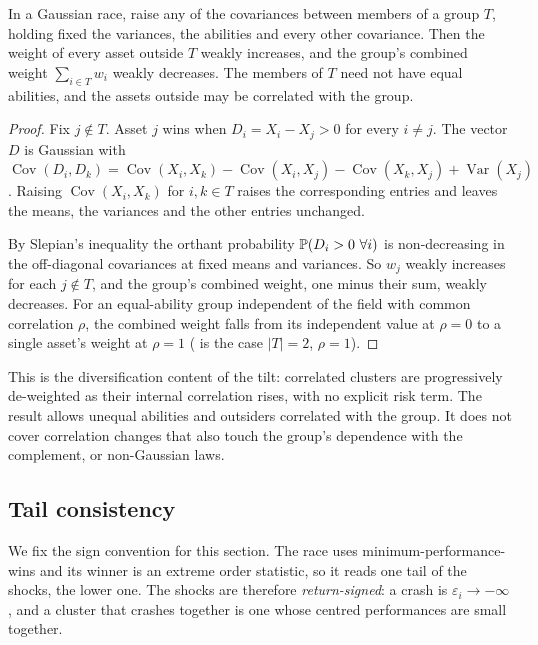 \begin{proposition}
\label{prop:monotone}
In a Gaussian race, raise any of the covariances between members of a group $T$,
holding fixed the variances, the abilities and every other covariance. Then the
weight of every asset outside $T$ weakly increases, and the group's combined weight
$\sum_{i\in T} w_i$ weakly decreases. The members of $T$ need not have equal
abilities, and the assets outside may be correlated with the group.
\end{proposition}
\begin{proof}
Fix $j \notin T$. Asset $j$ wins when $D_i = X_i - X_j > 0$ for every $i \neq j$.
The vector $D$ is Gaussian with
$\operatorname{Cov}(D_i, D_k) = \operatorname{Cov}(X_i, X_k)
- \operatorname{Cov}(X_i, X_j) - \operatorname{Cov}(X_k, X_j)
+ \operatorname{Var}(X_j)$. Raising $\operatorname{Cov}(X_i, X_k)$ for
$i, k \in T$ raises the corresponding entries and leaves the means, the variances
and the other entries unchanged.

By Slepian's inequality \parencite{slepian1962} the orthant probability
$\mathbb{P}(D_i > 0\ \forall i)$ is non-decreasing in the off-diagonal covariances at
fixed means and variances. So $w_j$ weakly increases for each $j \notin T$, and the
group's combined weight, one minus their sum, weakly decreases. For an
equal-ability group independent of the field with common correlation $\rho$, the
combined weight falls from its independent value at $\rho = 0$ to a single asset's
weight at $\rho = 1$ ( is the case $|T| = 2$, $\rho = 1$).
\end{proof}

\noindent This is the diversification content of the tilt: correlated clusters
are progressively de-weighted as their internal correlation rises, with no
explicit risk term. The result allows unequal abilities and outsiders correlated
with the group. It does not cover correlation changes that also touch the group's
dependence with the complement, or non-Gaussian laws.

\subsection{Tail consistency}
\label{sec:tail}

We fix the sign convention for this section.
The race uses
minimum-performance-wins and its winner is an extreme order statistic, so it
reads one tail of the shocks, the lower one.
The shocks are therefore
\emph{return-signed}: a crash is $\varepsilon_i \to -\infty$, and a cluster that
crashes together is one whose centred performances are small together.

